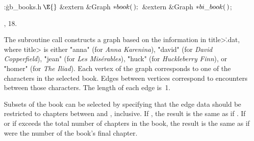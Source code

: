 \Y\B\4:\.{gb\_books.h\,}\X${}\E{}$\6
\&{extern} \&{Graph} ${}{*}\\{book}(\,);{}$\6
\&{extern} \&{Graph} ${}{*}\\{bi\_book}(\,){}$;\par
{}, 18.\fi

The subroutine call 
constructs a graph based on the information in \<title>\.{.dat},
where \<title> is either \.{"anna"} (for {\sl Anna Karenina\/}),
\.{"david"} (for {\sl David Copperfield\/}),
\.{"jean"} (for {\sl Les Mis\'erables\/}),
\.{"huck"} (for {\sl Huckleberry Finn\/}), or
\.{"homer"} (for {\sl The Iliad\/}).
Each vertex of the graph corresponds to one of the characters in the
selected book. Edges between vertices correspond to encounters between
those characters. The length of each edge is~1.

Subsets of the book can be selected by specifying that the edge data should be
restricted to chapters between  and ,
inclusive. If , the result is the same as if
. If  or if  exceeds
the total number of chapters in the book, the result is the same as
if  were the number of the book's final chapter.

